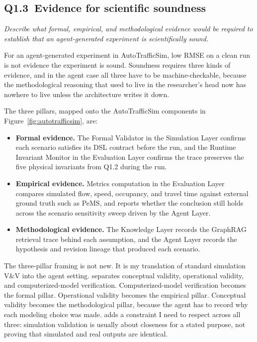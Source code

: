 \begin{bibunit}[plainnat]
\subsection{Q1.3\ Evidence for scientific soundness}

\textit{Describe what formal, empirical, and methodological evidence would be required to establish that an agent-generated experiment is scientifically sound.}

For an agent-generated experiment in AutoTrafficSim, low RMSE on a clean run
is not evidence the experiment is sound. Soundness requires three kinds of
evidence, and in the agent case all three have to be machine-checkable,
because the methodological reasoning that used to live in the researcher's
head now has nowhere to live unless the architecture writes it down.

The three pillars, mapped onto the AutoTrafficSim components in
Figure~\ref{fig:autotrafficsim}, are:

\begin{itemize}
    \item \textbf{Formal evidence.} The Formal Validator in the Simulation
    Layer confirms each scenario satisfies its DSL contract before the run,
    and the Runtime Invariant Monitor in the Evaluation Layer confirms the
    trace preserves the five physical invariants from Q1.2 during the run.
    \item \textbf{Empirical evidence.} Metrics computation in the Evaluation
    Layer compares simulated flow, speed, occupancy, and travel time against
    external ground truth such as PeMS, and reports whether the conclusion
    still holds across the scenario sensitivity sweep driven by the Agent
    Layer.
    \item \textbf{Methodological evidence.} The Knowledge Layer records the
    GraphRAG retrieval trace behind each assumption, and the Agent Layer
    records the hypothesis and revision lineage that produced each scenario.
\end{itemize}

The three-pillar framing is not new. It is my translation of standard
simulation V\&V into the agent setting. \citet{sargent2010verification}
separates conceptual validity, operational validity, and computerized-model
verification. Computerized-model verification becomes the formal pillar.
Operational validity becomes the empirical pillar. Conceptual validity
becomes the methodological pillar, because the agent has to record why each
modeling choice was made. \citet{law1991simulation} adds a constraint I need
to respect across all three: simulation validation is usually about closeness
for a stated purpose, not proving that simulated and real outputs are
identical.


\end{bibunit}
